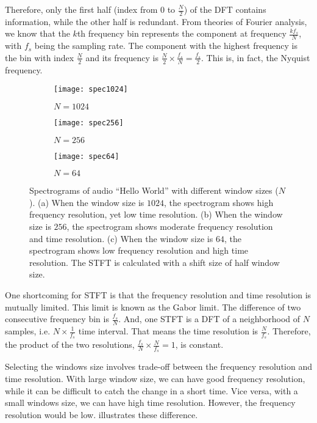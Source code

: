\documentclass[12pt,final,twoside]{report}
\begin{document}
Therefore, only the first half (index from $0$ to $\frac{N}{2}$) of the DFT contains information, while the other half is redundant. From theories of Fourier analysis, we know that the $k$th frequency bin represents the component at frequency $\frac{kf_s}{N}$, with $f_s$ being the sampling rate. The component with the highest frequency is the bin with index $\frac{N}{2}$ and its frequency is $\frac{N}{2} \times \frac{f_s}{N} = \frac{f_s}{2}$. This is, in fact, the Nyquist frequency.

\begin{figure}[t]
  \centering
  \begin{subfigure}[b]{.8\textwidth}
    \texttt{[image: spec1024]}
    \caption{$N=1024$}
    \label{fig:spec1024}
  \end{subfigure}

  \begin{subfigure}[b]{.8\textwidth}
    \texttt{[image: spec256]}
    \caption{$N=256$}
    \label{fig:spec256}
  \end{subfigure}

  \begin{subfigure}[b]{.8\textwidth}
    \texttt{[image: spec64]}
    \caption{$N=64$}
    \label{fig:spec64}
  \end{subfigure}

  \caption[Spectrograms with different window sizes]{Spectrograms of audio ``Hello World'' with different window sizes ($N$). (a) When the window size is $1024$, the spectrogram shows high frequency resolution, yet low time resolution.
    (b) When the window size is $256$, the spectrogram shows moderate frequency resolution and time resolution.
    (c) When the window size is $64$, the spectrogram shows low frequency resolution and high time resolution.
  The STFT is calculated with a shift size of half window size. }
  \label{fig:spec}
\end{figure}

One shortcoming for STFT is that the frequency resolution and time resolution is mutually limited. This limit is known as the Gabor limit. The difference of two consecutive frequency bin is $\frac{f_s}{N}$. And, one STFT is a DFT of a neighborhood of $N$ samples, i.e. $N \times \frac{1}{f_s}$ time interval. That means the time resolution is $\frac{N}{f_s}$. Therefore, the product of the two resolutions, $\frac{f_s}{N} \times \frac{N}{f_s} = 1$, is constant. 

Selecting the windows size involves trade-off between the frequency resolution and time resolution. With large window size, we can have good frequency resolution, while it can be difficult to catch the change in a short time. Vice versa, with a small windows size, we can have high time resolution. However, the frequency resolution would be low.  illustrates these difference.
\end{document}
